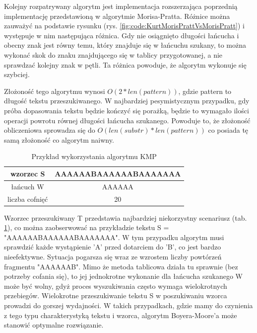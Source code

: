 Kolejny rozpatrywany algorytm jest implementacja rozszerzająca poprzednią 
implementację przedstawioną w algorytmie Morisa-Pratta. Różnice można zauważyć na podstawie rysunku
(rys. \ref{fig:code:KurtMorisPrattVsMorisPratt}) i występuje w nim następująca różnica.
Gdy nie osiągnięto długości łańcucha i obecny znak jest równy temu, który 
znajduje się w łańcuchu szukany, to można wykonać skok do znaku znajdującego
się w tablicy przygotowanej, a nie sprawdzać kolejny znak w pętli. Ta różnica
powoduje, że algorytm wykonuje się szybciej.

Złożoność tego algorytmu wynosi $O(2*{len(pattern)})$, gdzie pattern to długość
tekstu przeszukiwanego. W najbardziej pesymistycznym przypadku, gdy próba dopasowania tekstu będzie 
kończyć się porażką, będzie to wymagało ilości operacji powrotu równej długości 
łańcucha szukanego. Powoduje to, że złożoność obliczeniowa sprowadza się do
$O({len(substr)}*{len(pattern)})$ co posiada tę samą złożoność co algorytm naiwny. 

\begin{table}
  \centering
  \begin{tabular}{ |c|c|  } 
    \hline
    wzorzec S & AAAAAABAAAAAABAAAAAAA \\
    \hline
    łańcuch W & AAAAAA \\
    \hline
    liczba cofnięć & 20 \\
    \hline
  \end{tabular}
  \caption{Przykład wykorzystania algorytmu KMP}
  \label{tabela:KMPExampleSlow}
\end{table}

Wzorzec przeszukiwany T przedstawia najbardziej niekorzystny scenariusz 
(tab. \ref{tabela:KMPExampleSlow}), co można zaobserwować na przykładzie tekstu 
S = "AAAAAABAAAAAABAAAAAAA". W tym przypadku algorytm musi sprawdzić każde
wystąpienie 'A' przed dotarciem do 'B', co jest bardzo nieefektywne. Sytuacja 
pogarsza się wraz ze wzrostem liczby powtórzeń fragmentu "AAAAAAB". Mimo że 
metoda tablicowa działa tu sprawnie (bez potrzeby cofania się), to jej 
jednokrotne wykonanie dla łańcucha szukanego W może być wolny, gdyż proces
wyszukiwania często wymaga wielokrotnych przebiegów. Wielokrotne przeszukiwanie
tekstu S w poszukiwaniu wzorca prowadzi do gorszej wydajności. W takich 
przypadkach, gdzie mamy do czynienia z tego typu charakterystyką tekstu 
i wzorca, algorytm Boyera-Moore'a może stanowić optymalne rozwiązanie.

